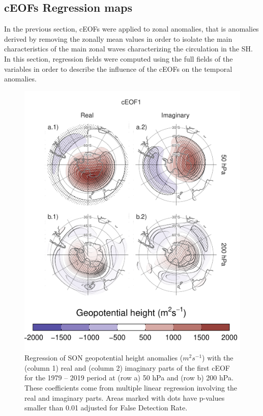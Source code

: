 \documentclass[smallextended]{svjour3}       %
\begin{document}
\hypertarget{regressions}{%
\subsection{cEOFs Regression maps}\label{regressions}}

In the previous section, cEOFs were applied to zonal anomalies, that is anomalies derived by removing the zonally mean values in order to isolate the main characteristics of the main zonal waves characterizing the circulation in the SH.
In this section, regression fields were computed using the full fields of the variables in order to describe the influence of the cEOFs on the temporal anomalies.



\begin{figure}
\centering
\includegraphics{../figures/eof1-regr-gh-1.pdf}
\caption{\label{fig:eof1-regr-gh}Regression of SON geopotential height anomalies (\(m^2s^{-1}\)) with the (column 1) real and (column 2) imaginary parts of the first cEOF for the 1979 -- 2019 period at (row a) 50 hPa and (row b) 200 hPa. These coefficients come from multiple linear regression involving the real and imaginary parts. Areas marked with dots have p-values smaller than 0.01 adjusted for False Detection Rate.}
\end{figure}
\end{document}
